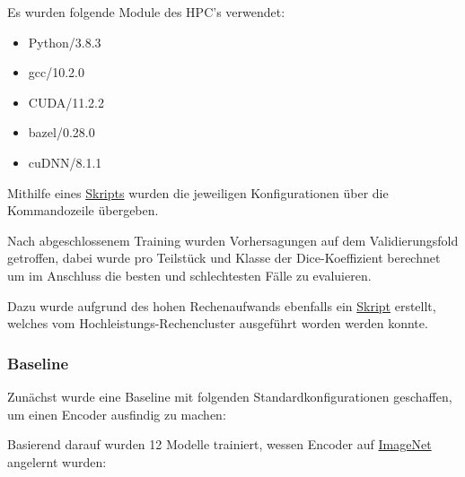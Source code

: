 Es wurden folgende Module des HPC's verwendet: 
\begin{itemize}
\item Python/3.8.3
\item gcc/10.2.0
\item CUDA/11.2.2
\item bazel/0.28.0
\item cuDNN/8.1.1
\end{itemize}

Mithilfe eines \href{https://github.com/vitoleonardo/HealthyOrganTracker/blob/main/jobscript/job}{Skripts} wurden die jeweiligen Konfigurationen über die Kommandozeile übergeben. 

Nach abgeschlossenem Training wurden Vorhersagungen auf dem Validierungsfold getroffen, dabei wurde pro Teilstück und Klasse der Dice-Koeffizient berechnet um im Anschluss die besten und schlechtesten Fälle zu evaluieren.

Dazu wurde aufgrund des hohen Rechenaufwands ebenfalls ein \href{https://github.com/vitoleonardo/HealthyOrganTracker/blob/673a743c99af3771f88289eca6db33ab7d1bfe48/hpc_train_files/util/getperformance.py}{Skript} erstellt, welches vom Hochleistungs-Rechencluster ausgeführt worden werden konnte. 

\subsubsection{Baseline}

Zunächst wurde eine Baseline mit folgenden Standardkonfigurationen geschaffen, um einen Encoder ausfindig zu machen:

\begin{table}[H]
\centering
{}
\caption{\label{tab:widgets}Baseline Einstellungen}
\end{table}

Basierend darauf wurden 12 Modelle trainiert, wessen Encoder auf
\href{https://www.image-net.org/}{ImageNet} angelernt wurden:

